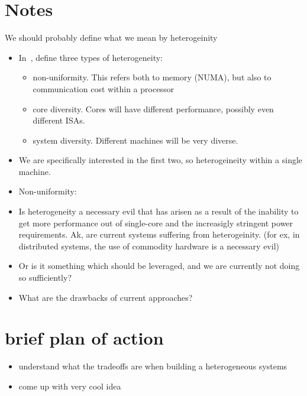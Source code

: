 \section{Notes}

We should probably define what
we mean by heterogeinity

\begin{itemize}
\item In~\cite{SPBRBHI:08}, define three types of heterogeneity:
\begin{itemize}
\item non-uniformity.  This refers both to memory (NUMA), but also
to communication cost within a processor
\item core diversity. Cores will have different performance, possibly
even different ISAs.
\item system diversity. Different machines will be very diverse.
\end{itemize}
\item We are specifically interested in the first two, so heterogeineity
within a single machine.
\item Non-uniformity:
\item Is heterogeneity a necessary evil that has arisen as
a result of the inability to get more performance out of single-core
and the increasigly stringent power requirements. Ak,
are current systems suffering from heterogeinity. (for ex,
in distributed systems, the use of commodity hardware is a necessary evil)
\item Or is it something which should be leveraged, and we are currently
not doing so sufficiently?
\item What are the drawbacks of current approaches?
\end{itemize}
\section{brief plan of action}
\begin{itemize}
 \item understand what the tradeoffs are
when building a heterogeneous systems
 \item come up with very cool idea
\end{itemize}
